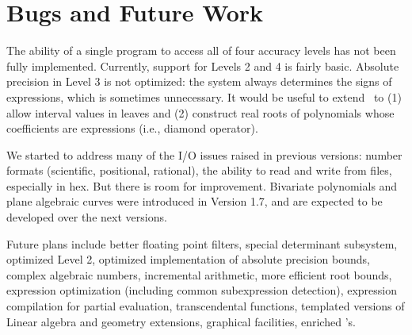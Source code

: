 \documentclass[12pt]{article}
\begin{document}
\section{Bugs and Future Work}
\label{sec-problems}

The ability of a single program to access all of four
accuracy levels has not been fully implemented.
Currently, support for Levels 2 and 4 is fairly basic.
Absolute precision in Level 3 is not optimized: the system
always determines the signs of expressions, which is sometimes
unnecessary.  It would be useful to extend
\expr\ to (1) allow interval values in leaves and
(2) construct real roots of polynomials whose  
coefficients are expressions (i.e., diamond operator).

We started to address many of the I/O issues raised in
previous versions: number formats (scientific, positional, rational),
the ability to read and write from files, especially in hex.
But there is room for improvement.
Bivariate polynomials and plane algebraic curves 
were introduced in Version 1.7, and are expected to be
developed over the next versions.


Future plans include
better floating point filters,
special determinant subsystem,
optimized Level 2,
optimized implementation of absolute precision bounds,
complex algebraic numbers,
incremental arithmetic,
more efficient root bounds,
expression optimization (including common subexpression detection),
expression compilation for partial evaluation,
transcendental functions,
templated versions of Linear algebra and geometry extensions,
graphical facilities,
enriched \corex's.
\end{document}
